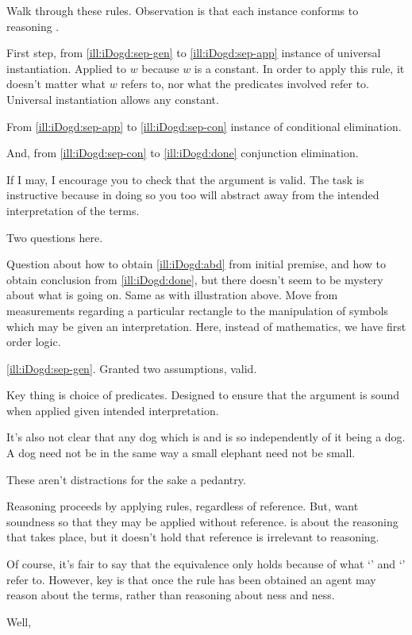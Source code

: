 \begin{note}
  Walk through these rules.
  Observation is that each instance conforms to reasoning \nr{}.

  First step, from \ref{ill:iDogd:sep-gen} to \ref{ill:iDogd:sep-app} instance of universal instantiation.
  Applied to \(w\) because \(w\) is a constant.
  In order to apply this rule, it doesn't matter what \(w\) refers to, nor what the predicates involved refer to.
  Universal instantiation allows any constant.

  From \ref{ill:iDogd:sep-app} to \ref{ill:iDogd:sep-con} instance of conditional elimination.

  And, from \ref{ill:iDogd:sep-con} to \ref{ill:iDogd:done} conjunction elimination.

  If I may, I encourage you to check that the argument is valid.
  The task is instructive because in doing so you too will abstract away from the intended interpretation of the terms.
\end{note}

\begin{note}
  Two questions here.

  Question about how to obtain \ref{ill:iDogd:abd} from initial premise, and how to obtain conclusion from \ref{ill:iDogd:done}, but there doesn't seem to be mystery about what is going on.
  Same as with illustration above.
  Move from measurements regarding a particular rectangle to the manipulation of symbols which may be given an interpretation.
  Here, instead of mathematics, we have first order logic.

  \ref{ill:iDogd:sep-gen}.
  Granted two assumptions, valid.

  Key thing is choice of predicates.
  Designed to ensure that the argument is sound when applied given intended interpretation.

  It's also not clear that any dog which is \RIPa{} and \RIPb{} is so independently of it being a dog.
  A \RIPb{} dog need not be \RIPb{} in the same way a small elephant need not be small.

  These aren't distractions for the sake a pedantry.

  Reasoning proceeds by applying rules, regardless of reference.
  But, want soundness so that they may be applied without reference.
  \nr{} is about the reasoning that takes place, but it doesn't hold that reference is irrelevant to reasoning.


  Of course, it's fair to say that the equivalence only holds because of what `\RIPa{}' and `\RIPb{}' refer to.
  However, key is that once the rule has been obtained an agent may reason about the terms, rather than reasoning about \RIPa{}ness and \RIPb{}ness.


  Well, 
\end{note}

